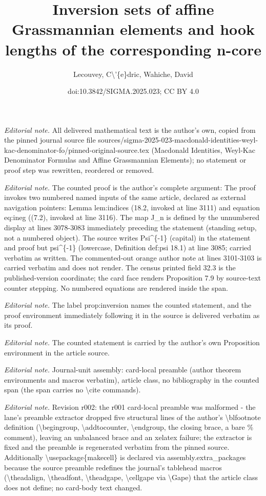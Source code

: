 \documentclass[10pt,a4paper]{article}
\title{Inversion sets of affine Grassmannian elements and hook lengths of the corresponding n-core}
\author{Lecouvey, C\textbackslash{}'\{e\}dric, Wahiche, David}
\date{doi:10.3842/SIGMA.2025.023; CC BY 4.0}
\numberwithin{equation}{section}
\begin{document}
\maketitle
\setcounter{section}{7}
\setcounter{Theorem}{8}
\setcounter{equation}{2}
\noindent\textit{Editorial note.} All delivered mathematical text is the author's own, copied from the pinned journal source file sources/sigma-2025-023-macdonald-identities-weyl-kac-denominator-fo/pinned-original-source.tex (Macdonald Identities, Weyl-Kac Denominator Formulas and Affine Grassmannian Elements); no statement or proof step was rewritten, reordered or removed.\par\medskip
\noindent\textit{Editorial note.} The counted proof is the author's complete argument: The proof invokes two numbered named inputs of the same article, declared as external navigation pointers: Lemma lem:indices (18.2, invoked at line 3111) and equation eq:ineg ((7.2), invoked at line 3116). The map J\_n is defined by the unnumbered display at lines 3078-3083 immediately preceding the statement (standing setup, not a numbered object). The source writes Psi\textasciicircum{}\{-1\} (capital) in the statement and proof but psi\textasciicircum{}\{-1\} (lowercase, Definition def:psi 18.1) at line 3085; carried verbatim as written. The commented-out orange author note at lines 3101-3103 is carried verbatim and does not render. The census printed field 32.3 is the published-version coordinate; the card face renders Proposition 7.9 by source-text counter stepping. No numbered equations are rendered inside the span.\par\medskip
\noindent\textit{Editorial note.} The label prop:inversion names the counted statement, and the proof environment immediately following it in the source is delivered verbatim as its proof.\par\medskip
\noindent\textit{Editorial note.} The counted statement is carried by the author's own Proposition environment in the article source.\par\medskip
\noindent\textit{Editorial note.} Journal-unit assembly: card-local preamble (author theorem environments and macros verbatim), article class, no bibliography in the counted span (the span carries no \textbackslash{}cite commands).\par\medskip
\noindent\textit{Editorial note.} Revision r002: the r001 card-local preamble was malformed - the lane's preamble extractor dropped five structural lines of the author's \textbackslash{}blfootnote definition (\textbackslash{}begingroup, \textbackslash{}addtocounter, \textbackslash{}endgroup, the closing brace, a bare \% comment), leaving an unbalanced brace and an xelatex failure; the extractor is fixed and the preamble is regenerated verbatim from the pinned source. Additionally \textbackslash{}usepackage\{makecell\} is declared via assembly.extra\_packages because the source preamble redefines the journal's tablehead macros (\textbackslash{}theadalign, \textbackslash{}theadfont, \textbackslash{}theadgape, \textbackslash{}cellgape via \textbackslash{}Gape) that the article class does not define; no card-body text changed.\par\medskip
\end{document}
